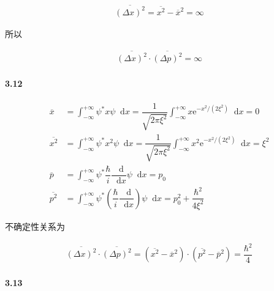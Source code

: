 \documentclass{article}
\newcommand*{\md}{\mathop{}\!\mathrm{d}}
\newcommand*{\me}{\mathrm{e}}
\begin{document}
\begin{equation*}
  \begin{aligned}
    \overline{\left( \Delta x \right)^2} =  \overline{x^2} - \overline{x}^2 = \infty
  \end{aligned}
\end{equation*}

所以

\begin{equation*}
  \begin{aligned}
    \overline{\left( \Delta x \right)^2} \cdot \overline{\left( \Delta p \right)^2} = \infty
  \end{aligned}
\end{equation*}

\paragraph{3.12}

\begin{equation*}
  \begin{aligned}
    \overline{x} &= \int_{-\infty}^{+\infty} \psi^{*} x \psi \md x = \dfrac{1}{\sqrt{2\pi \xi^2}} \int_{-\infty}^{+\infty} x \me^{-x^2 / \left( 2 \xi^2 \right)} \md x = 0 \\
    \overline{x^2} &= \int_{-\infty}^{+\infty} \psi^{*} x^2 \psi \md x = \dfrac{1}{\sqrt{2\pi \xi^2}} \int_{-\infty}^{+\infty} x^2 \me^{-x^2 / \left( 2 \xi^2 \right)} \md x = \xi^2 \\
    \overline{p} &= \int_{-\infty}^{+\infty} \psi^{*} \dfrac{\hbar}{i} \dfrac{\md}{\md x}   \psi \md x = p_0 \\
    \overline{p^2} &= \int_{-\infty}^{+\infty} \psi^{*} \left( \dfrac{\hbar}{i} \dfrac{\md}{\md x} \right)  \psi \md x = p_0^2 + \dfrac{\hbar^2}{4 \xi^2}
  \end{aligned}
\end{equation*}

不确定性关系为

\begin{equation*}
  \begin{aligned}
    \overline{\left( \Delta x \right)^2} \cdot \overline{\left( \Delta p \right)^2}
    = \left( \overline{x^2} - \overline{x}^2 \right) \cdot \left( \overline{p^2} - \overline{p}^2 \right)
    = \dfrac{\hbar^2}{4} 
  \end{aligned}
\end{equation*}

\paragraph{3.13}
\end{document}
